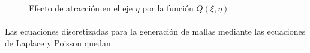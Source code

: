 \documentclass[letterpaper, openright, 12pt]{book}
\begin{document}
        \begin{figure}[htbp!]
            \centering
            \hspace{1cm}
            \caption[Efecto de atracción por función $Q(\xi,\eta)$]{Efecto de
            atracción en el eje $\eta$ por la función $Q(\xi, \eta)$}
            \label{fig:densidad-eta}
        \end{figure}

    \paragraph*{}
        Las ecuaciones discretizadas para la generación de mallas mediante las
        ecuaciones de Laplace y Poisson quedan
\end{document}
